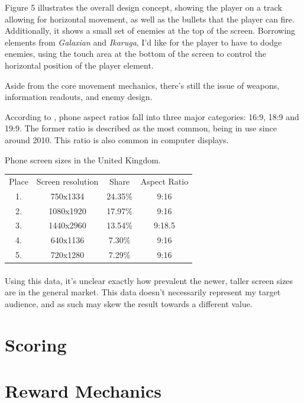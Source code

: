 \documentclass{scrartcl}
\let\cite\textcite
\let\citep\autocite
\begin{document}
Figure 5 illustrates the overall design concept, showing the player on a track allowing for horizontal movement, as well as the bullets that the player can fire. Additionally, it shows a small set of enemies at the top of the screen. Borrowing elements from \textit{Galaxian} and \textit{Ikaruga}, I'd like for the player to have to dodge enemies, using the touch area at the bottom of the screen to control the horizontal position of the player element.

Aside from the core movement mechanics, there's still the issue of weapons, information readouts, and enemy design.

According to \cite{Techlector001}, phone aspect ratios fall into three major categories: 16:9, 18:9 and 19:9. The former ratio is described as the most common, being in use since around 2010. This ratio is also common in computer displays.

Phone screen sizes in the United Kingdom. \citep{DeviceAtlas2019}

\begin{tabular}{ c c c c }

  Place & Screen resolution & Share   & Aspect Ratio \\

  1.    & 750x1334          & 24.35\% & 9:16         \\

  2.    & 1080x1920         & 17.97\% & 9:16         \\

  3.    & 1440x2960         & 13.54\% & 9:18.5       \\

  4.    & 640x1136          & 7.30\%  & 9:16         \\

  5.    & 720x1280          & 7.29\%  & 9:16         \\
\end{tabular}

\paragraph{}

Using this data, it's unclear exactly how prevalent the newer, taller screen sizes are in the general market. This data doesn't necessarily represent my target audience, and as such may skew the result towards a different value.

\section{Scoring}

\section{Reward Mechanics}

\printbibliography
\end{document}
